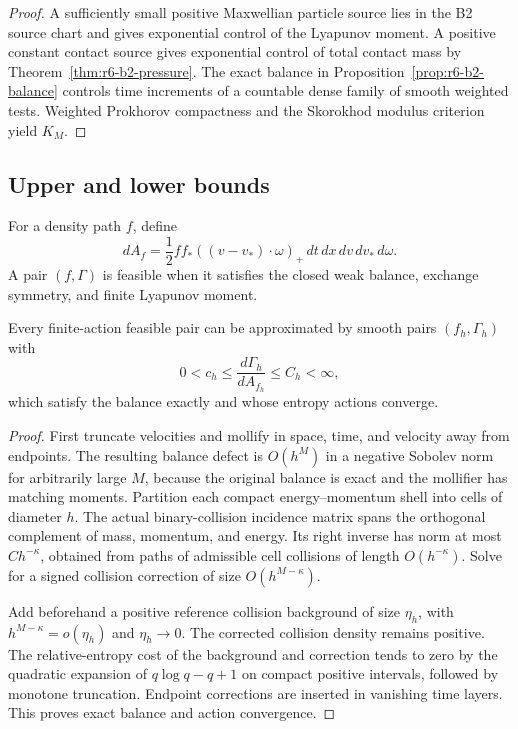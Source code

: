 \begin{proof}
A sufficiently small positive Maxwellian particle source lies in the B2 source
chart and gives exponential control of the Lyapunov moment.  A positive
constant contact source gives exponential control of total contact mass by
Theorem~\ref{thm:r6-b2-pressure}.  The exact balance in
Proposition~\ref{prop:r6-b2-balance} controls time increments of a countable
dense family of smooth weighted tests.  Weighted Prokhorov compactness and the
Skorokhod modulus criterion yield \(K_M\).
\end{proof}

\subsection{Upper and lower bounds}

For a density path \(f\), define
\[
dA_f=\frac12ff_*((v-v_*)\cdot\omega)_+
\,dt\,dx\,dv\,dv_*\,d\omega.
\]
A pair \((f,\Gamma)\) is feasible when it satisfies the closed weak balance,
exchange symmetry, and finite Lyapunov moment.

\begin{lemma}
\label{lem:r6-b2-regularize}
Every finite-action feasible pair can be approximated by smooth pairs
\((f_h,\Gamma_h)\) with
\[
0<c_h\le\frac{d\Gamma_h}{dA_{f_h}}\le C_h<\infty,
\]
which satisfy the balance exactly and whose entropy actions converge.
\end{lemma}

\begin{proof}
First truncate velocities and mollify in space, time, and velocity away from
endpoints.  The resulting balance defect is \(O(h^M)\) in a negative Sobolev
norm for arbitrarily large \(M\), because the original balance is exact and
the mollifier has matching moments.  Partition each compact energy--momentum
shell into cells of diameter \(h\).  The actual binary-collision incidence
matrix spans the orthogonal complement of mass, momentum, and energy.  Its
right inverse has norm at most \(Ch^{-\kappa}\), obtained from paths of
admissible cell collisions of length \(O(h^{-\kappa})\).  Solve for a signed
collision correction of size \(O(h^{M-\kappa})\).

Add beforehand a positive reference collision background of size
\(\eta_h\), with
\(h^{M-\kappa}=o(\eta_h)\) and \(\eta_h\to0\).  The corrected collision
density remains positive.  The relative-entropy cost of the background and
correction tends to zero by the quadratic expansion of \(q\log q-q+1\) on
compact positive intervals, followed by monotone truncation.  Endpoint
corrections are inserted in vanishing time layers.  This proves exact balance
and action convergence.
\end{proof}

